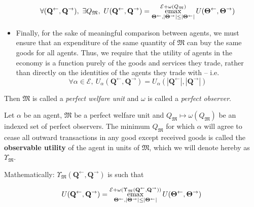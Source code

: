 \documentclass[smallextended]{svjour3}
\newcommand{\economy}{\ensuremath{\mathcal{E}}}
\newcommand{\emax}{\ensuremath{\operatornamewithlimits{emax}}}
\newcommand{\quants}{\ensuremath{Q}} %
\newcommand{\quantl}{\ensuremath{\mathbf{Q}}} %
\newcommand{\quantg}{\ensuremath{\mathbf{\Theta}}} %
\newcommand{\agenta}{\ensuremath{\alpha}}
\newcommand{\agentz}{\ensuremath{\omega}}
\newcommand{\money}{\ensuremath{\mathfrak{M}}}
\newcommand{\utility}{\ensuremath{U}}
\newcommand{\outility}{\ensuremath{\Upsilon}}
\begin{document}
\begin{definition}
\begin{itemize}
        \begin{equation}
            \label{eq:pwu3}
            \forall (\quantl^\leftarrow, \quantl^\rightarrow), \ \exists \quants_\money,\  \utility(\quantl^\leftarrow, \quantl^\rightarrow) = \emax\limits_{\quantg^\leftarrow, |\quantg^\rightarrow|\le |\quantg^{\leftarrow}|}^{\economy + \agentz(\quants_\money)} \utility(\quantg^\leftarrow, \quantg^\rightarrow)
        \end{equation}
        \item Finally, for the sake of meaningful comparison between agents, we must ensure that an expenditure of the same quantity of $\money$ can buy the same goods for all agents. Thus, we require that the utility of agents in the economy is a function purely of the goods and services they trade, rather than directly on the identities of the agents they trade with -- i.e.
        \begin{equation}
            \label{eq:pwu4} 
            \forall \agenta\in\economy,\  \utility_\agenta(\quantl^\leftarrow, \quantl^\rightarrow) = \utility_\agenta(|\quantl^\leftarrow|, |\quantl^\rightarrow|)
        \end{equation}
    \end{itemize}
    Then $\money$ is called a \emph{perfect welfare unit} and $\agentz$ is called a \emph{perfect observer}.
\end{definition}

\begin{definition}
    \label{dfn:ou}
    Let $\agenta$ be an agent, $\money$ be a perfect welfare unit and $\quants_\money\mapsto \agentz(\quants_\money)$ be an indexed set of perfect observers. The minimum $\quants_\money$ for which $\agenta$ will agree to cease all outward transactions in any good except received goods is called the \textbf{observable utility} of the agent in units of $\money$, which we will denote hereby as $\outility_\money$.
    
    Mathematically: $\outility_\money(\quantl^\leftarrow, \quantl^\rightarrow)$ is such that 
    
    \begin{equation}
        \label{eq:ou}
        \utility(\quantl^\leftarrow, \quantl^\rightarrow) = \emax\limits_{\quantg^\leftarrow, |\quantg^\rightarrow|\le |\quantg^{\leftarrow}|}^{\economy + \agentz(\outility_\money(\quantl^\leftarrow, \quantl^\rightarrow))} \utility(\quantg^\leftarrow, \quantg^\rightarrow)
    \end{equation}
\end{definition}
\end{document}
